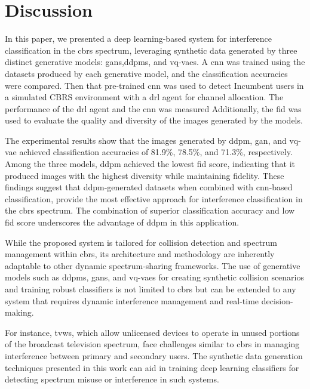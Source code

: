 \chapter{Discussion}
\label{chap:discussion}

In this paper, we presented a deep learning-based system for interference classification in the \gls{cbrs} spectrum, leveraging synthetic data generated by three distinct generative models: \gls{gan}s,\gls{ddpm}s, and \gls{vq-vae}s. A \gls{cnn} was trained using the datasets produced by each generative model, and the classification accuracies were compared. Then that pre-trained \gls{cnn} was used to detect Incumbent users in a simulated CBRS environment with a \gls{drl} agent for channel allocation. The performance of the \gls{drl} agent and the \gls{cnn} was measured Additionally, the \gls{fid} was used to evaluate the quality and diversity of the images generated by the models.  

The experimental results show that the images generated by \gls{ddpm}, \gls{gan}, and \gls{vq-vae} achieved classification accuracies of 81.9\%, 78.5\%, and 71.3\%, respectively. Among the three models, \gls{ddpm} achieved the lowest \gls{fid} score, indicating that it produced images with the highest diversity while maintaining fidelity. These findings suggest that \gls{ddpm}-generated datasets when combined with \gls{cnn}-based classification, provide the most effective approach for interference classification in the \gls{cbrs} spectrum. The combination of superior classification accuracy and low \gls{fid} score underscores the advantage of \gls{ddpm} in this application.  

While the proposed system is tailored for collision detection and spectrum management within \gls{cbrs}, its architecture and methodology are inherently adaptable to other dynamic spectrum-sharing frameworks. The use of generative models such as \gls{ddpm}s, \gls{gan}s, and \gls{vq-vae}s for creating synthetic collision scenarios and training robust classifiers is not limited to \gls{cbrs} but can be extended to any system that requires dynamic interference management and real-time decision-making.  

For instance, \gls{tvws}\cite{13}, which allow unlicensed devices to operate in unused portions of the broadcast television spectrum, face challenges similar to \gls{cbrs} in managing interference between primary and secondary users. The synthetic data generation techniques presented in this work can aid in training deep learning classifiers for detecting spectrum misuse or interference in such systems.  

